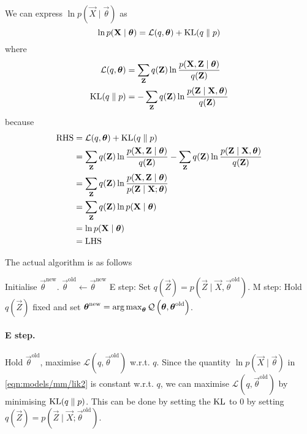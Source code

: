 We can express $\ln p(\vec X \mid \vec \theta)$ as
\begin{equation}
    \ln p(\boldsymbol{\mathbf{X}} \mid \boldsymbol{\mathbf{\theta}}) = \mathcal L(q, \boldsymbol{\mathbf{\theta}}) + \operatorname{KL}(q \parallel p) \label{eqn:models/mm/lik2}
\end{equation}
where
\begin{align}
    \mathcal L(q, \boldsymbol{\mathbf{\theta}})  &= \sum_{\boldsymbol{\mathbf{Z}}} q(\boldsymbol{\mathbf{Z}}) \ln \frac{p(\boldsymbol{\mathbf{X}}, \boldsymbol{\mathbf{Z}} \mid \boldsymbol{\mathbf{\theta}})}{q(\boldsymbol{\mathbf{Z}})} \\
    \operatorname{KL}(q \parallel p)          &= -\sum_{\boldsymbol{\mathbf{Z}}} q(\boldsymbol{\mathbf{Z}}) \ln \frac{p(\boldsymbol{\mathbf{Z}} \mid \boldsymbol{\mathbf{X}}, \boldsymbol{\mathbf{\theta}})}{q(\boldsymbol{\mathbf{Z}})}
\end{align}
because
\begin{align*}
    \text{RHS}  &= \mathcal L(q, \boldsymbol{\mathbf{\theta}}) + \operatorname{KL}(q \parallel p)\\
                &= \sum_{\boldsymbol{\mathbf{Z}}} q(\boldsymbol{\mathbf{Z}}) \ln \frac{p(\boldsymbol{\mathbf{X}}, \boldsymbol{\mathbf{Z}} \mid \boldsymbol{\mathbf{\theta}})}{q(\boldsymbol{\mathbf{Z}})} - \sum_{\boldsymbol{\mathbf{Z}}} q(\boldsymbol{\mathbf{Z}}) \ln \frac{p(\boldsymbol{\mathbf{Z}} \mid \boldsymbol{\mathbf{X}}, \boldsymbol{\mathbf{\theta}})}{q(\boldsymbol{\mathbf{Z}})} \\
                &= \sum_{\boldsymbol{\mathbf{Z}}} q(\boldsymbol{\mathbf{Z}}) \ln \frac{p(\boldsymbol{\mathbf{X}}, \boldsymbol{\mathbf{Z}} \mid \boldsymbol{\mathbf{\theta}})}{p(\boldsymbol{\mathbf{Z}} \mid \boldsymbol{\mathbf{X}}; \boldsymbol{\mathbf{\theta}})} \\
                &= \sum_{\boldsymbol{\mathbf{Z}}} q(\boldsymbol{\mathbf{Z}}) \ln p(\boldsymbol{\mathbf{X}} \mid \boldsymbol{\mathbf{\theta}}) \\
                &= \ln p(\boldsymbol{\mathbf{X}} \mid \boldsymbol{\mathbf{\theta}}) \\
                &= \text{LHS}
\end{align*}

The actual algorithm is as follows
\begin{algorithmbis}\label{alg:em}
    \begin{algorithmic}[1]
        \State Initialise $\vec \theta^{\text{new}}$.
        \Repeat
            \State $\vec \theta^{\text{old}} \gets \vec \theta^{\text{new}}$
            \State E step: Set $q(\vec Z) = p\left(\vec Z \mid \vec X, \vec \theta^{\text{old}}\right)$.
            \State M step: Hold $q(\vec Z)$ fixed and set $\boldsymbol{\mathbf{\theta}}^{\text{new}} = \operatorname*{arg\,max}_{\boldsymbol{\mathbf{\theta}}} \mathcal Q\left(\boldsymbol{\mathbf{\theta}}, \boldsymbol{\mathbf{\theta}}^{\text{old}}\right)$.
    \end{algorithmic}
\end{algorithmbis}

\paragraph{E step.} Hold $\vec \theta^{\text{old}}$, maximise $\mathcal L\left(q, \vec \theta^{\text{old}}\right)$ w.r.t. $q$. Since the quantity $\ln p(\vec X \mid \vec \theta)$ in \eqref{eqn:models/mm/lik2} is constant w.r.t. $q$, we can maximise $\mathcal L\left(q, \vec \theta^{\text{old}}\right)$ by minimising $\operatorname{KL}(q \parallel p)$. This can be done by setting the $\operatorname{KL}$ to $0$ by setting $q(\vec Z) = p(\vec Z \mid \vec X; \vec \theta^{\text{old}})$.

